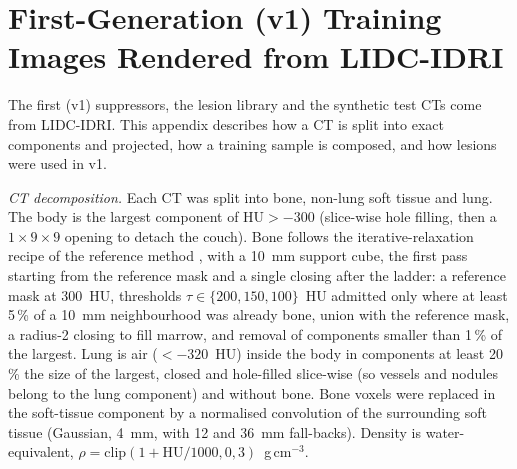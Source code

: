 \appendices
\section{First-Generation (v1) Training Images Rendered from LIDC-IDRI}
\label{app:v1}
The first (v1) suppressors, the lesion library and the synthetic test CTs come from LIDC-IDRI. This appendix describes how a CT is split
into exact components and projected, how a training sample is composed, and how lesions were used in v1.

\emph{CT decomposition.} Each CT was split into bone, non-lung soft tissue and lung. The body is the largest component of $\mathrm{HU}>-300$
(slice-wise hole filling, then a $1{\times}9{\times}9$ opening to detach the couch). Bone follows the iterative-relaxation recipe of the
reference method \cite[Algorithm~1]{angaitkar2026anatomy}, with a 10~mm support cube, the first pass starting from the reference mask and a
single closing after the ladder: a reference mask at 300~HU, thresholds $\tau\in\{200,150,100\}$~HU admitted only where at least 5\,\% of a
10~mm neighbourhood was already bone, union with the reference mask, a radius-2 closing to fill marrow, and removal of components smaller
than 1\,\% of the largest. Lung is air ($<-320$~HU) inside the body in components at least 20\,\% the size of the largest, closed and
hole-filled slice-wise (so vessels and nodules belong to the lung component) and without bone. Bone voxels were replaced in the
soft-tissue component by a normalised convolution of the surrounding soft tissue (Gaussian, 4~mm, with 12 and 36~mm fall-backs). Density is
water-equivalent, $\rho=\mathrm{clip}(1+\mathrm{HU}/1000,0,3)$~g\,cm$^{-3}$.

